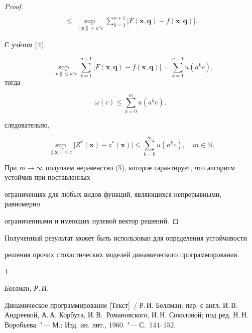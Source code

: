 \begin{proof}
\begin{multline*}
\\

\leqslant

\sup \limits_{\| \boldsymbol x\|\leqslant a^nc} 

\sum\limits_{k=1}^{n+1} 

\big| F(\boldsymbol x, \boldsymbol q)-f(\boldsymbol x, \boldsymbol q) \big|. 

\end{multline*}



С учётом (4) 

$$

\sup \limits_{\| \boldsymbol x\|\leqslant a^nc} 

\sum \limits_{k=1}^{n+1} 

\bigl| F(\boldsymbol x, \boldsymbol q)-f(\boldsymbol x, \boldsymbol q) \bigr| =

\sum\limits_{k=1}^{n+1} u(a^kc) ,$$ тогда

\[

\omega (c)\leqslant \sum\limits_{k=0}^m u(a^kc) ,

\]

следовательно,

\[

\sup \limits_{\| \boldsymbol x\|\leqslant c} 

\bigl| Z^\ast (\boldsymbol x)-z^\ast (\boldsymbol x) \bigr|

\leqslant \sum\limits_{k=0}^m u(a^kc) ,\quad m \in \mathbb N.

\]



При $m\to \infty $ получаем неравенство (5), которое гарантирует, что алгоритм устойчив при поставленных 

ограничениях для любых видов функций, являющихся непрерывными, равномерно 

ограниченными и имеющих нулевой вектор решений.

\end{proof}



Полученный результат может быть использован для определения устойчивости 

решения прочих стохастических моделей динамического программирования. 







\begin{thebibliography}{1}

\item 

	\textit{Беллман, Р.\,И.} 

	Динамическое программирование [Текст]~/ Р.\,И. Беллман; пер. с англ. И.\,В. Андреевой, А.\,А. Корбута, И.\,В.~Романовского, И.\,Н. Соколовой; под ред. Н.\,Н. Воробьева. "--- М.: Изд. ин. лит., 1960. "--- С.~144--152. 

\end{thebibliography}



\vspace{-1.2cm}



\makeengtitle





